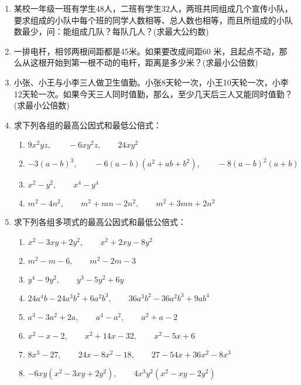 \begin{enumerate}
\item 某校一年级一班有学生48人，二班有学生32人，两班共同组成几个宣传小队，要求组成的小队中每个班的同学人数相等、总人数也相等，而且所组成的小队数最少，问：能组成几队？每队几人？(求最大公约数)
\item 一排电杆，相邻两根间距都是45米。如果要改成间距60
米，且起点不动，那么从这根开始到第一根不动的电杆，距离是多少米？(求最小公倍数)
\item 小张、小王与小李三人做卫生值勤。小张8天轮一次，小王10天轮一次，小李12天轮一次。如果今天三人同时值勤，那么，至少几天后三人又能同时值勤？(求最小公倍数)
\item 求下列各组的最高公因式和最低公倍式：
\begin{enumerate}
    \item $9 x^{2} y z,\qquad -6 x y^{2} z,\qquad 24 x y^{2}$
    \item $-3(a-b)^{3},\qquad -6(a-b)\left(a^{2}+a b+b^{2}\right),\qquad -8(a-b)^{2}(a+b)$
    \item $x^{2}-y^{2},\qquad  x^{4}-y^{4}$
    \item $m^{2}-4 n^{2},\qquad  m^{2}+m n-2 n^{2},\qquad m^{2}+3 m n+2 n^{2}$
\end{enumerate}

\item 求下列各组多项式的最高公因式和最低公倍式：
\begin{enumerate}
    \item $x^{2}-3 x y+2 y^{2},\qquad  x^{2}+2 x y-8 y^{2}$
    \item  $m^{2}-m-6,\qquad  m^{2}-2 m-3 $
    \item $y^{4}-9 y^{2},\qquad  y^{3}-5 y^{2}+6 y$
    \item  $24 a^{4} b-24 a^{3} b^{2}+6 a^{2} b^{3}, \qquad  36 a^{3} b^{2}-36 a^{2} b^{3}+9 a b^{4}$
    \item ${a}^{3}-3 a^{2}+2 a,\qquad  a^{4}-a^{2},\qquad  a^{2}+a-2$
    \item  $x^{2}-x-2,\qquad  x^{2}+14 x-32,\qquad  x^{2}-5 x+6$
    \item  $8 x^{3}-27,\qquad 24 x-8 x^{2}-18,\qquad 27-54 x+36 x^{2}-8 x^{3}$ 
    \item  $-6 x y\left(x^{2}-3 x y+2 y^{2}\right),\qquad  4 x^{3} y^{2}\left(x^{2}-x y-2 y^{2}\right)$
\end{enumerate}


\end{enumerate}

